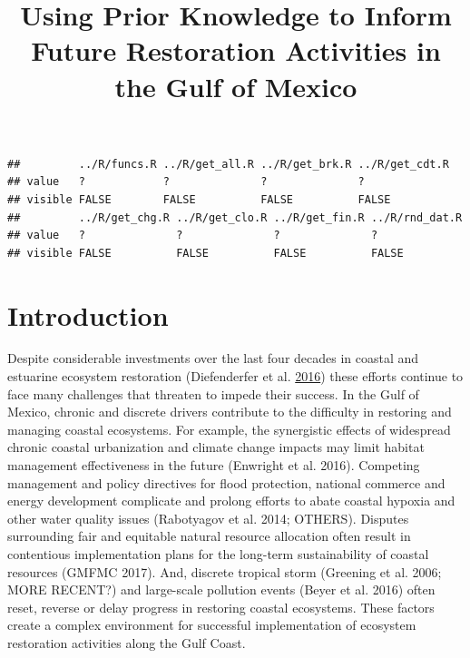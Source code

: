 \documentclass[]{article}
\title{Using Prior Knowledge to Inform Future Restoration Activities in the
Gulf of Mexico}
\author{}
\date{}
\begin{document}
\maketitle

\begin{verbatim}
##         ../R/funcs.R ../R/get_all.R ../R/get_brk.R ../R/get_cdt.R
## value   ?            ?              ?              ?             
## visible FALSE        FALSE          FALSE          FALSE         
##         ../R/get_chg.R ../R/get_clo.R ../R/get_fin.R ../R/rnd_dat.R
## value   ?              ?              ?              ?             
## visible FALSE          FALSE          FALSE          FALSE
\end{verbatim}

\section{Introduction}\label{introduction}

Despite considerable investments over the last four decades in coastal
and estuarine ecosystem restoration (Diefenderfer et al.
\protect\hyperlink{ref-Diefenderfer16}{2016}) these efforts continue to
face many challenges that threaten to impede their success. In the Gulf
of Mexico, chronic and discrete drivers contribute to the difficulty in
restoring and managing coastal ecosystems. For example, the synergistic
effects of widespread chronic coastal urbanization and climate change
impacts may limit habitat management effectiveness in the future
(Enwright et al. 2016). Competing management and policy directives for
flood protection, national commerce and energy development complicate
and prolong efforts to abate coastal hypoxia and other water quality
issues (Rabotyagov et al. 2014; OTHERS). Disputes surrounding fair and
equitable natural resource allocation often result in contentious
implementation plans for the long-term sustainability of coastal
resources (GMFMC 2017). And, discrete tropical storm (Greening et al.
2006; MORE RECENT?) and large-scale pollution events (Beyer et al. 2016)
often reset, reverse or delay progress in restoring coastal ecosystems.
These factors create a complex environment for successful implementation
of ecosystem restoration activities along the Gulf Coast.
\end{document}
